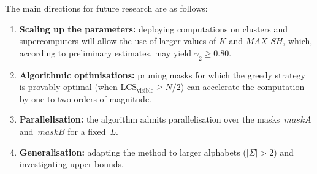 \documentclass[12pt,a4paper]{article}
\begin{document}
The main directions for future research are as follows:
\begin{enumerate}
  \item \textbf{Scaling up the parameters:} deploying computations on clusters and supercomputers will allow the use of larger values of $K$ and $\mathit{MAX\_SH}$, which, according to preliminary estimates, may yield $\gamma_2 \geq 0.80$.
  \item \textbf{Algorithmic optimisations:} pruning masks for which the greedy strategy is provably optimal (when $\mathrm{LCS}_{\text{visible}} \geq N/2$) can accelerate the computation by one to two orders of magnitude.
  \item \textbf{Parallelisation:} the algorithm admits parallelisation over the masks~$\mathit{maskA}$ and~$\mathit{maskB}$ for a fixed~$L$.
  \item \textbf{Generalisation:} adapting the method to larger alphabets ($|\Sigma| > 2$) and investigating upper bounds.
\end{enumerate}
\end{document}
